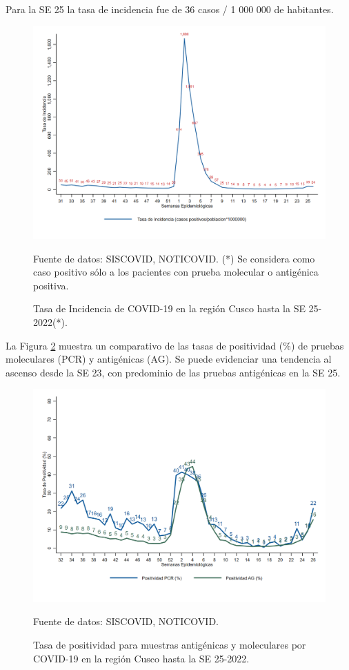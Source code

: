 \documentclass[12pt,a4paper,openany]{book}
\begin{document}
	Para la SE 25 la tasa de incidencia fue de 36 casos / 1 000 000 de habitantes. 
	
	\begin{figure}[h]
		\caption{Tasa de Incidencia de COVID-19 en la región Cusco hasta la SE 25-2022(*).  }\label{fig:incidencia}
		\begin{center}
			\includegraphics[width=0.90\linewidth]{../figuras/tasa_incidencia_2021_2022.png}
		\end{center}
		{\footnotesize {Fuente de datos: SISCOVID, NOTICOVID. (*) Se considera como caso positivo sólo a los pacientes con prueba molecular o antigénica positiva.}}
	\end{figure}
	
	\pagebreak
	
	
	La Figura \ref{fig:total_muestras_procesada} muestra un comparativo de las tasas de positividad ($\%$) de pruebas moleculares (PCR) y antigénicas (AG). Se puede evidenciar una tendencia al ascenso desde la SE 23, con predominio de las pruebas antigénicas en la SE 25.
	
	\begin{figure}[h]
		\caption{Tasa de positividad para muestras antigénicas y moleculares por COVID-19 en la región Cusco hasta la SE 25-2022. }\label{fig:total_muestras_procesada}
		\begin{center}
			\includegraphics[width=0.80\linewidth]{../figuras/positividad_diaria_2021_2022.png}
		\end{center}
		{\footnotesize {Fuente de datos: SISCOVID, NOTICOVID.}}
	\end{figure}
	
\end{document}
